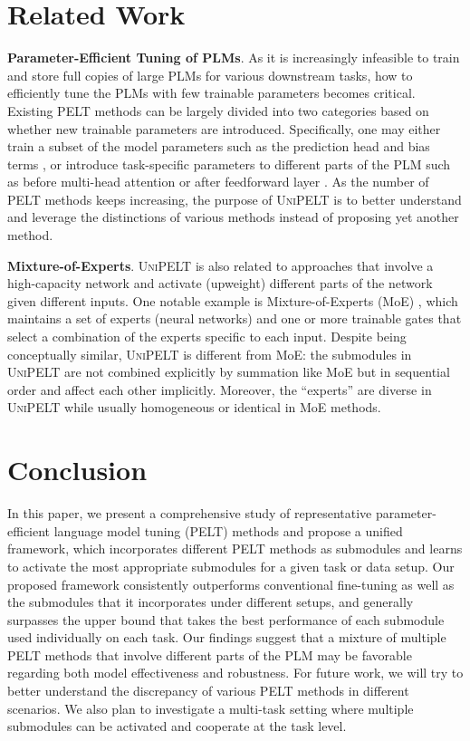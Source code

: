 \section{Related Work}
{{\bf Parameter-Efficient Tuning of PLMs}.} As it is increasingly infeasible to train and store full copies of large PLMs for various downstream tasks, how to efficiently tune the PLMs with few trainable parameters becomes critical. Existing PELT methods can be largely divided into two categories based on whether new trainable parameters are introduced. Specifically, one may either train a subset of the model parameters such as the prediction head \cite{lee2019would} and bias terms \cite{ben2021bitfit}, or introduce task-specific parameters to different parts of the PLM such as before multi-head attention \cite{li-liang-2021-prefix} or after feedforward layer \cite{houlsby2019parameter}. As the number of PELT methods keeps increasing, the purpose of \textsc{UniPELT} is to better understand and leverage the distinctions of various methods instead of proposing yet another method.

{{\bf Mixture-of-Experts}.}
\textsc{UniPELT} is also related to approaches that involve a high-capacity network and activate (upweight) different parts of the network given different inputs. One notable example is Mixture-of-Experts (MoE) \cite{jacobs1991adaptive,shazeer2017outrageously}, which maintains a set of experts (neural networks) and one or more trainable gates that select a combination of the experts specific to each input. Despite being conceptually similar, \textsc{UniPELT} is different from MoE: the submodules in \textsc{UniPELT} are not combined explicitly by summation like MoE but in sequential order and affect each other implicitly. Moreover, the ``experts'' are diverse in \textsc{UniPELT} while usually homogeneous or identical in MoE methods. 

\section{Conclusion}
In this paper, we present a comprehensive study of representative parameter-efficient language model tuning (PELT) methods and propose a unified framework, which incorporates different PELT methods as submodules and learns to activate the most appropriate submodules for a given task or data setup. Our proposed framework consistently outperforms conventional fine-tuning as well as the submodules that it incorporates under different setups, and generally surpasses the upper bound that takes the best performance of each submodule used individually on each task. Our findings suggest that a mixture of multiple PELT methods that involve different parts of the PLM may be favorable regarding both model effectiveness and robustness. For future work, we will try to better understand the discrepancy of various PELT methods in different scenarios. We also plan to investigate a multi-task setting where multiple submodules can be activated and cooperate at the task level.


